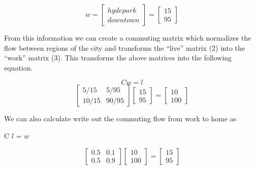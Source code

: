 \documentclass{article}
\theoremstyle{definition}
\theoremstyle{remark}
\begin{document}
\begin{equation}
      w
   =
  \begin{bmatrix}
    hyde park\\
    downtown
  \end{bmatrix} = 
  \begin{bmatrix}
    15\\
    95
  \end{bmatrix}
\end{equation}

From this information we can create a commuting matrix which normalizes the flow between regions of the city and transforms the “live” matrix (2) into the “work” matrix (3).  This transforms the above matrices into the following equation.

\begin{equation}C w = l\end{equation}
\begin{equation} 
  \begin{bmatrix}
    5/15 & 5/95\\
    10/15 & 90/95
  \end{bmatrix}
  \begin{bmatrix}
    15\\
    95
  \end{bmatrix}
  = 
  \begin{bmatrix}
    10\\
    100
  \end{bmatrix}
\end{equation}

We can also calculate write out the commuting flow from work to home as

\begin{center}C $l$ = $w$\end{center}
\begin{equation} 
  \begin{bmatrix}
    0.5 & 0.1\\
    0.5 & 0.9
  \end{bmatrix}
  \begin{bmatrix}
    10\\
    100
  \end{bmatrix}
  = 
  \begin{bmatrix}
    15\\
    95
  \end{bmatrix}
\end{equation}
\end{document}

